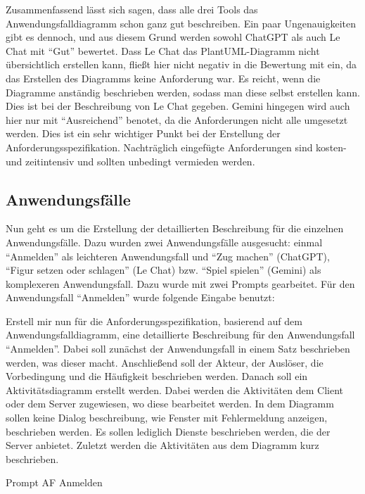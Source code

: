 Zusammenfassend lässt sich sagen, dass alle drei Tools das Anwendungsfalldiagramm schon ganz gut beschreiben. Ein paar Ungenauigkeiten gibt 
es dennoch, und aus diesem Grund werden sowohl ChatGPT als auch Le Chat mit ``Gut'' bewertet. Dass Le Chat das PlantUML-Diagramm nicht übersichtlich 
erstellen kann, fließt hier nicht negativ in die Bewertung mit ein, da das Erstellen des Diagramms keine Anforderung war. Es reicht, wenn die 
Diagramme anständig beschrieben werden, sodass man diese selbst erstellen kann. Dies ist bei der Beschreibung von Le Chat gegeben. Gemini hingegen 
wird auch hier nur mit ``Ausreichend'' benotet, da die Anforderungen nicht alle umgesetzt werden. Dies ist ein sehr wichtiger Punkt bei der Erstellung 
der Anforderungsspezifikation. Nachträglich eingefügte Anforderungen sind kosten- und zeitintensiv und sollten unbedingt vermieden werden.

\subsection*{Anwendungsfälle}

Nun geht es um die Erstellung der detaillierten Beschreibung für die einzelnen Anwendungsfälle. Dazu wurden zwei Anwendungsfälle ausgesucht: 
einmal ``Anmelden'' als leichteren Anwendungsfall und ``Zug machen'' (ChatGPT), ``Figur setzen oder schlagen'' (Le Chat) bzw. ``Spiel spielen'' (Gemini) 
als komplexeren Anwendungsfall. Dazu wurde mit zwei Prompts gearbeitet. Für den Anwendungsfall ``Anmelden'' wurde folgende Eingabe benutzt:

\begin{prompt}[H]
    \begin{tcolorbox}[colback=gray!20, colframe=gray!20, boxrule=0pt, sharp corners] 
        Erstell mir nun für die Anforderungsspezifikation, basierend auf dem Anwendungsfalldiagramm, eine detaillierte Beschreibung für den Anwendungsfall ``Anmelden''. Dabei 
        soll zunächst der Anwendungsfall in einem Satz beschrieben werden, was dieser macht. Anschließend soll der Akteur, der Auslöser, die Vorbedingung und die Häufigkeit 
        beschrieben werden. Danach soll ein Aktivitätsdiagramm erstellt werden. Dabei werden die Aktivitäten dem Client oder dem Server zugewiesen, wo diese bearbeitet werden. 
        In dem Diagramm sollen keine Dialog beschreibung, wie Fenster mit Fehlermeldung anzeigen, beschrieben werden. Es sollen lediglich Dienste beschrieben werden, die der 
        Server anbietet. Zuletzt werden die Aktivitäten aus dem Diagramm kurz beschrieben.
        \vfill
    \end{tcolorbox}
    \caption{Prompt AF Anmelden}
    \label{Prompt AF Anmelden}
\end{prompt}

